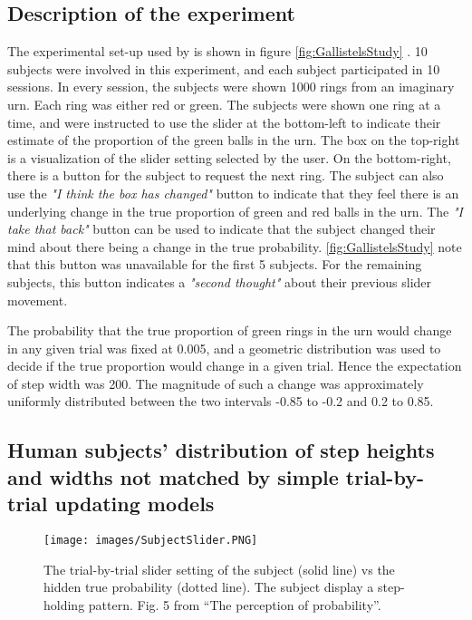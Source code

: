 \documentclass{article}
\begin{document}
\subsection{Description of the experiment}
The experimental set-up used by \cite{gallistel2014perception} is shown in figure \ref{fig:GallistelsStudy} . 10 subjects were involved in this experiment, and each subject participated in 10 sessions. In every session, the subjects were shown 1000 rings from an imaginary urn. Each ring was either red or green. The subjects were shown one ring at a time, and were instructed to use the slider at the bottom-left to indicate their estimate of the proportion of the green balls in the urn. The box on the top-right is a visualization of the slider setting selected by the user. On the bottom-right, there is a button for the subject to request the next ring. The subject can also use the \textit{"I think the box has changed"} button to indicate that they feel there is an underlying change in the true proportion of green and red balls in the urn. The \textit{"I take that back"} button can be used to indicate that the subject changed their mind about there being a change in the true probability. \ref{fig:GallistelsStudy} note that this button was unavailable for the first 5 subjects. For the remaining subjects, this button indicates a \textit{"second thought"} about their previous slider movement.

The probability that the true proportion of green rings in the urn would change in any given trial was fixed at 0.005, and a geometric distribution was used to decide if the true proportion would change in a given trial. Hence the expectation of step width was 200. The magnitude of such a change was approximately uniformly distributed between the two intervals -0.85 to -0.2 and 0.2 to 0.85. 

\subsection{Human subjects' distribution of step heights and widths not matched by simple trial-by-trial updating models}


\begin{figure}
	\texttt{[image: images/SubjectSlider.PNG]}
	\caption{The trial-by-trial slider setting of the subject (solid line) vs the hidden true probability (dotted line). The subject display a step-holding pattern. Fig. 5 from ``The perception of probability''. }
	\label{fig:subjectSlider}
\end{figure}
\end{document}
